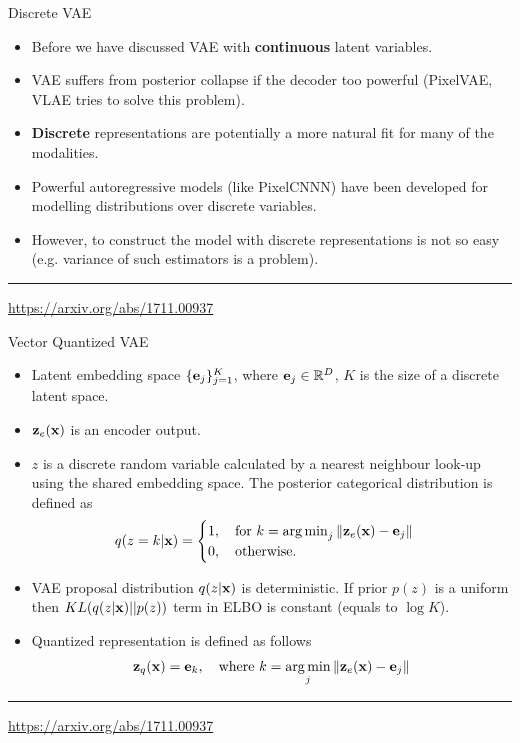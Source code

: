 \begin{frame}{Discrete VAE}
	\begin{itemize}
		\item Before we have discussed VAE with \textbf{continuous} latent variables.
		\item VAE suffers from posterior collapse if the decoder too powerful (PixelVAE, VLAE tries to solve this problem).
		\item \textbf{Discrete} representations are potentially a more natural fit for many of the modalities.
		\item Powerful autoregressive models (like PixelCNNN) have been developed for modelling distributions over discrete variables.
		\item However, to construct the model with discrete representations is not so easy (e.g. variance of such estimators is a problem).
	\end{itemize}
	\vfill
	\hrule\medskip
	{\scriptsize \href{https://arxiv.org/abs/1711.00937}{https://arxiv.org/abs/1711.00937}} 
\end{frame}
\begin{frame}{Vector Quantized VAE}
	\begin{itemize}
		\item Latent embedding space $\{\mathbf{e}_j\}_{j=1}^K$, where $\mathbf{e}_j \in \mathbb{R}^D$, $K$ is the size of a discrete latent space.
		\item $\mathbf{z}_e(\mathbf{x})$ is an encoder output.
		\item $z$ is a discrete random variable calculated by a nearest neighbour look-up using the shared embedding space. The posterior categorical distribution is defined as 
		\[
			q(z = k | \mathbf{x}) = \begin{cases}
				1 , \quad \text{for } k = \operatorname*{arg\,min}_j \| \mathbf{z}_e(\mathbf{x}) - \mathbf{e}_j \| \\
				0, \quad \text{otherwise}.
			\end{cases}
		\]
		
		\item VAE proposal distribution $q(z | \mathbf{x})$ is deterministic. If prior $p(z)$ is a uniform then $KL(q(z| \mathbf{x}) || p(z))$ term in ELBO is constant (equals to $\log K$).
		\item Quantized representation is defined as follows
		\[
			\mathbf{z}_q(\mathbf{x}) = \mathbf{e}_k, \quad \text{where } k = \operatorname*{arg\,min}_j \| \mathbf{z}_e(\mathbf{x}) - \mathbf{e}_j \| 
		\] 
		
	\end{itemize}
	\vfill
	\hrule\medskip
	{\scriptsize \href{https://arxiv.org/abs/1711.00937}{https://arxiv.org/abs/1711.00937}} 
\end{frame}
